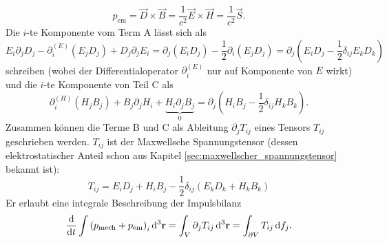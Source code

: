 \begin{equation*}
	p_{\mathrm{em}}=\vec {D}\times \vec {B}=\frac{1}{c^{2}}\vec {E}\times \vec {H}=\frac{1}{c^{2}}\vec {S}.
\end{equation*}
Die $i$-te Komponente vom Term A lässt sich als
\begin{equation*}
	E_{i}\partial _{j}D_{j}-\partial _{i}^{\left(E\right)}\left(E_{j}D_{j}\right)+D_{j}\partial _{j}E_{i}=\partial _{j}\left(E_{i}D_{j}\right)-\frac{1}{2}\partial _{i}\left(E_{j}D_{j}\right)=\partial _{j}\left(E_{i}D_{j}-\frac{1}{2}\delta _{ij}E_{k}D_{k}\right)
\end{equation*}
schreiben (wobei der Differentialoperator $\partial _{i}^{\left(E\right)}$ nur auf Komponente von $E$ wirkt) und die $i$-te Komponente von Teil C als
\begin{equation*}
	\partial _{i}^{\left(H\right)}\left(H_{j}B_{j}\right)+B_{j}\partial _{j}H_{i}+\underset{0}{\underbrace{H_{i}\partial _{j}B_{j}}}=\partial _{j}\left(H_{i}B_{j}-\frac{1}{2}\delta _{ij}H_{k}B_{k}\right).
\end{equation*}
Zusammen können die Terme B und C als Ableitung $\partial _{j}T_{ij}$ eines Tensors $T_{ij}$ geschrieben werden. $T_{ij}$ ist der Maxwellsche Spannungstensor (dessen elektrostatischer Anteil schon aus Kapitel \ref{sec:maxwellscher_spannungstensor} bekannt ist):
\begin{equation*}
	T_{ij}=E_{i}D_{j}+H_{i}B_{j}-\frac{1}{2}\delta _{ij}\left(E_{k}D_{k}+H_{k}B_{k}\right)
\end{equation*}
Er erlaubt eine integrale Beschreibung der Impulsbilanz
\begin{equation*}
	\frac{\diff }{\diff t}\int \left(p_{\mathrm{mech}}+p_{\mathrm{em}}\right)_{i}\diffa[3]{\vec{r}}=\int _{V}\partial _{j}T_{ij}\diffa[3]{\vec{r}}=\int _{\partial V}T_{ij}\diff f_{j}.
\end{equation*}
